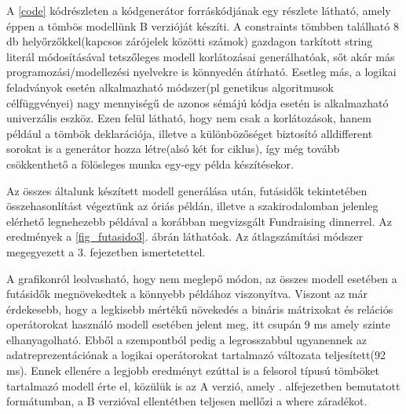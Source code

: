 \documentclass[12pt,a4paper]{report}
\begin{document}
    A \ref{code} kódrészleten a kódgenerátor forráskódjának egy részlete látható, amely éppen a tömbös modellünk B verzióját készíti.
    A constraints tömbben található 8 db helyőrzőkkel(kapcsos zárójelek közötti számok) gazdagon tarkított string literál módosításával tetszőleges modell korlátozásai generálhatóak, sőt akár más programozási/modellezési nyelvekre is könnyedén átírható.
    Esetleg más, a logikai feladványok esetén alkalmazható módszer(pl genetikus algoritmusok célfüggvényei) nagy mennyiségű de azonos sémájú kódja esetén is alkalmazható univerzális eszköz.
    Ezen felül látható, hogy nem csak a korlátozások, hanem például a tömbök deklarációja, illetve a különbözőséget biztosító alldifferent sorokat is a generátor hozza létre(alsó két for ciklus), így még tovább csökkenthető a fölösleges munka egy-egy példa készítésekor.
    
    
    Az összes általunk készített modell generálása után, futásidők tekintetében összehasonlítást végeztünk az óriás példán, illetve a szakirodalomban jelenleg elérhető legnehezebb példával a korábban megvizsgált Fundraising dinnerrel.
    Az eredmények a \ref{fig_futasido3}. ábrán láthatóak.
    Az átlagszámítási módszer megegyezett a  3. fejezetben ismertetettel.
    
    A grafikonról leolvasható, hogy nem meglepő módon, az összes modell  esetében a futásidők megnövekedtek a könnyebb példához viszonyítva.
    Viszont az már érdekesebb, hogy a legkisebb mértékű növekedés a bináris mátrixokat és relációs operátorokat használó modell esetében jelent meg, itt csupán 9 ms amely szinte elhanyagolható.
    Ebből a szempontból pedig a legrosszabbul ugyanennek az adatreprezentációnak a logikai operátorokat tartalmazó változata teljesített(92 ms).
    Ennek ellenére a legjobb eredményt ezúttal is a felsorol típusú tömböket tartalmazó modell érte el, közülük is az A verzió, amely . alfejezetben bemutatott formátumban, a B verzióval ellentétben teljesen mellőzi a where záradékot.
    
\end{document}
